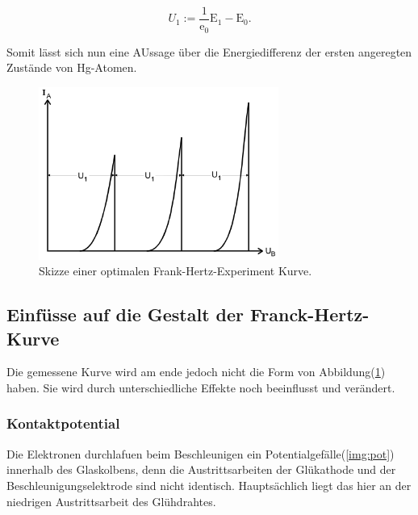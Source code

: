         \begin{equation*}
            U_1 := \frac{1}{\text{e}_0} \text{E}_1 - \text{E}_0 .
        \end{equation*}

        \noindent Somit lässt sich nun eine AUssage über die Energiedifferenz der ersten angeregten Zustände von Hg-Atomen.

        \begin{figure}[ht]
            \centering
            \includegraphics[width=0.7\textwidth]{latex/images/Kamm.PNG}
            \caption{Skizze einer optimalen Frank-Hertz-Experiment Kurve.}
            \label{img:Kamm}
        \end{figure}

    \subsection{Einfüsse auf die Gestalt der Franck-Hertz-Kurve}

        \noindent Die gemessene Kurve wird am ende jedoch nicht die Form von Abbildung(\ref{img:Kamm}) haben. Sie wird durch unterschiedliche Effekte 
        noch beeinflusst und verändert.

        \subsubsection{Kontaktpotential}

            \noindent Die Elektronen durchlafuen beim Beschleunigen ein Potentialgefälle(\ref{img:pot}) innerhalb des Glaskolbens, denn die Austrittsarbeiten der 
            Glükathode und der Beschleunigungselektrode sind nicht identisch. Hauptsächlich liegt das hier an der niedrigen Austrittsarbeit des 
            Glühdrahtes.

